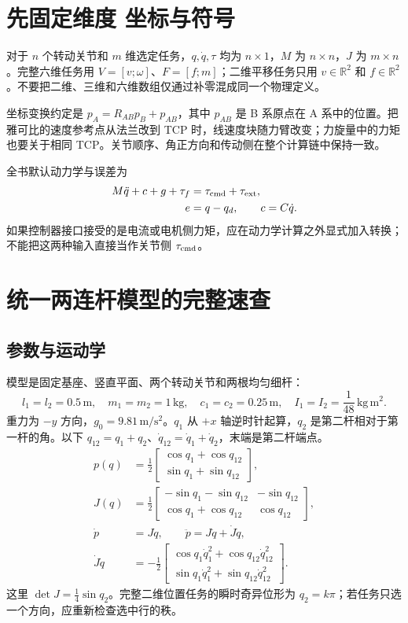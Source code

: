 \section{先固定维度 坐标与符号}

对于 $n$ 个转动关节和 $m$ 维选定任务，$q,\dot q,\tau$ 均为 $n\times1$，$M$ 为 $n\times n$，$J$ 为 $m\times n$。完整六维任务用 $V=[v;\omega]$、$F=[f;m]$；二维平移任务只用 $v\in\mathbb R^2$ 和 $f\in\mathbb R^2$。不要把二维、三维和六维数组仅通过补零混成同一个物理定义。

坐标变换约定是 $p_A=R_{AB}p_B+p_{AB}$，其中 $p_{AB}$ 是 B 系原点在 A 系中的位置。把雅可比的速度参考点从法兰改到 TCP 时，线速度块随力臂改变；力旋量中的力矩也要关于相同 TCP。关节顺序、角正方向和传动侧在整个计算链中保持一致。

全书默认动力学与误差为
\begin{align}
M\ddot q+c+g+\tau_f&=\tau_{\rm cmd}+\tau_{\rm ext},\\
e&=q-q_d,\qquad c=C\dot q.
\end{align}
如果控制器接口接受的是电流或电机侧力矩，应在动力学计算之外显式加入转换；不能把这两种输入直接当作关节侧 $\tau_{\rm cmd}$。

\section{统一两连杆模型的完整速查}

\subsection{参数与运动学}

模型是固定基座、竖直平面、两个转动关节和两根均匀细杆：
\[
l_1=l_2=0.5\,\mathrm m,\quad
m_1=m_2=1\,\mathrm{kg},\quad
c_1=c_2=0.25\,\mathrm m,\quad
I_1=I_2=\frac1{48}\,\mathrm{kg\,m^2}.
\]
重力为 $-y$ 方向，$g_0=9.81\,\mathrm{m/s^2}$。$q_1$ 从 $+x$ 轴逆时针起算，$q_2$ 是第二杆相对于第一杆的角。以下 $q_{12}=q_1+q_2$、$\dot q_{12}=\dot q_1+\dot q_2$，末端是第二杆端点。
\begin{align}
p(q)&=\frac12\begin{bmatrix}\cos q_1+\cos q_{12}\\\sin q_1+\sin q_{12}\end{bmatrix},\\
J(q)&=\frac12\begin{bmatrix}
-\sin q_1-\sin q_{12}&-\sin q_{12}\\
\cos q_1+\cos q_{12}&\cos q_{12}
\end{bmatrix},\\
\dot p&=J\dot q,\qquad
\ddot p=J\ddot q+\dot J\dot q,\\
\dot J\dot q&=-\frac12\begin{bmatrix}
\cos q_1\dot q_1^2+\cos q_{12}\dot q_{12}^2\\
\sin q_1\dot q_1^2+\sin q_{12}\dot q_{12}^2
\end{bmatrix}.
\end{align}
这里 $\det J=\tfrac14\sin q_2$。完整二维位置任务的瞬时奇异位形为 $q_2=k\pi$；若任务只选一个方向，应重新检查选中行的秩。

